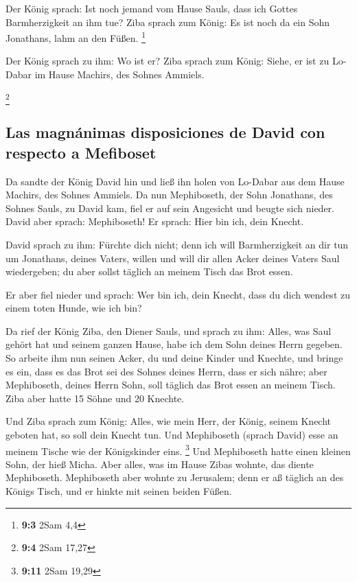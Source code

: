  Der König sprach: Ist noch jemand vom Hause Sauls, dass
ich Gottes Barmherzigkeit an ihm tue? Ziba sprach zum König: Es ist noch
da ein Sohn Jonathans, lahm an den Füßen. \footnote{\textbf{9:3} 2Sam
  4,4}

 Der König sprach zu ihm: Wo ist er? Ziba sprach zum
König: Siehe, er ist zu Lo-Dabar im Hause Machirs, des Sohnes Ammiels.

\footnote{\textbf{9:4} 2Sam 17,27}

\hypertarget{las-magnuxe1nimas-disposiciones-de-david-con-respecto-a-mefiboset}{%
\subsection{Las magnánimas disposiciones de David con respecto a
Mefiboset}\label{las-magnuxe1nimas-disposiciones-de-david-con-respecto-a-mefiboset}}

 Da sandte der König David hin und ließ ihn holen von
Lo-Dabar aus dem Hause Machirs, des Sohnes Ammiels.  Da
nun Mephiboseth, der Sohn Jonathans, des Sohnes Sauls, zu David kam,
fiel er auf sein Angesicht und beugte sich nieder. David aber sprach:
Mephiboseth! Er sprach: Hier bin ich, dein Knecht.

 David sprach zu ihm: Fürchte dich nicht; denn ich will
Barmherzigkeit an dir tun um Jonathans, deines Vaters, willen und will
dir allen Acker deines Vaters Saul wiedergeben; du aber sollst täglich
an meinem Tisch das Brot essen.

 Er aber fiel nieder und sprach: Wer bin ich, dein Knecht,
dass du dich wendest zu einem toten Hunde, wie ich bin?

 Da rief der König Ziba, den Diener Sauls, und sprach zu
ihm: Alles, was Saul gehört hat und seinem ganzen Hause, habe ich dem
Sohn deines Herrn gegeben.  So arbeite ihm nun seinen
Acker, du und deine Kinder und Knechte, und bringe es ein, dass es das
Brot sei des Sohnes deines Herrn, dass er sich nähre; aber Mephiboseth,
deines Herrn Sohn, soll täglich das Brot essen an meinem Tisch. Ziba
aber hatte 15 Söhne und 20 Knechte.

 Und Ziba sprach zum König: Alles, wie mein Herr, der
König, seinem Knecht geboten hat, so soll dein Knecht tun. Und
Mephiboseth (sprach David) esse an meinem Tische wie der Königskinder
eins. \footnote{\textbf{9:11} 2Sam 19,29}  Und
Mephiboseth hatte einen kleinen Sohn, der hieß Micha. Aber alles, was im
Hause Zibas wohnte, das diente Mephiboseth.  Mephiboseth
aber wohnte zu Jerusalem; denn er aß täglich an des Königs Tisch, und er
hinkte mit seinen beiden Füßen.

